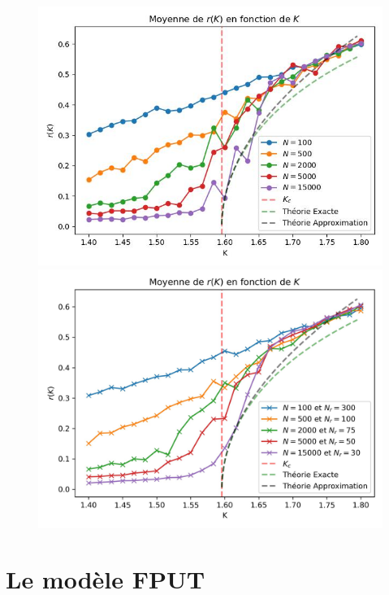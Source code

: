 \documentclass[a4paper, 11pt]{article}
\begin{document}
\begin{figure}[H]
    \begin{minipage}[c]{0.49\linewidth}
        \centering
        \includegraphics[width=\linewidth]{pics/kura9.jpg}
        \caption{}
        \label{fig:Kura9}
    \end{minipage} \hfill
    \begin{minipage}[c]{0.49\linewidth}
        \centering
        \includegraphics[width=\linewidth]{pics/kura9_good.jpg}
        \caption{}
        \label{fig:Kura9_good}
    \end{minipage}
\end{figure}

\section{Le modèle FPUT}
\end{document}
